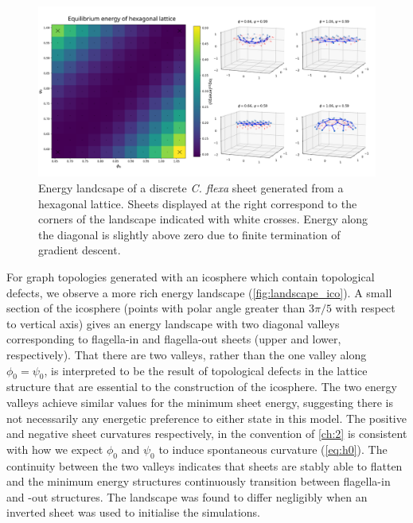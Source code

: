 \begin{figure}
	\centering
	\includegraphics[width=\textwidth]{landscape_hex.png}
	\caption[Energy landscape of a discrete \textit{C. flexa} sheet generated from a hexagonal lattice]{Energy landcsape of a discrete \textit{C. flexa} sheet generated from a hexagonal lattice. Sheets displayed at the right correspond to the corners of the landscape indicated with white crosses. Energy along the diagonal is slightly above zero due to finite termination of gradient descent.}
	\label{fig:landscape_flat}
\end{figure}

For graph topologies generated with an icosphere which contain topological defects, we observe a more rich energy landscape (\cref{fig:landscape_ico}).
A small section of the icosphere (points with polar angle greater than $3\pi/5$ with respect to vertical axis) gives an energy landscape with two diagonal valleys corresponding to flagella-in and flagella-out sheets (upper and lower, respectively).
That there are two valleys, rather than the one valley along $\phi_0 = \psi_0$, is interpreted to be the result of topological defects in the lattice structure that are essential to the construction of the icosphere. 
The two energy valleys achieve similar values for the minimum sheet energy, suggesting there is not necessarily any energetic preference to either state in this model.
The positive and negative sheet curvatures respectively, in the convention of \cref{ch:2} is consistent with how we expect $\phi_0$ and $\psi_0$ to induce spontaneous curvature (\cref{eq:h0}).
The continuity between the two valleys indicates that sheets are stably able to flatten and the minimum energy structures continuously transition between flagella-in and -out structures. 
The landscape was found to differ negligibly when an inverted sheet was used to initialise the simulations.

